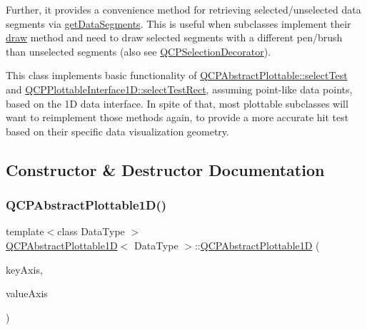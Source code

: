 Further, it provides a convenience method for retrieving selected/unselected data segments via \hyperlink{class_q_c_p_abstract_plottable1_d_ae890e62ce403c54f575c73b9529f1af8}{get\+Data\+Segments}. This is useful when subclasses implement their \hyperlink{class_q_c_p_abstract_plottable_a453f676a5cee7bf846c5f0fa05ea84b3}{draw} method and need to draw selected segments with a different pen/brush than unselected segments (also see \hyperlink{class_q_c_p_selection_decorator}{Q\+C\+P\+Selection\+Decorator}).

This class implements basic functionality of \hyperlink{class_q_c_p_abstract_plottable_a38efe9641d972992a3d44204bc80ec1d}{Q\+C\+P\+Abstract\+Plottable\+::select\+Test} and \hyperlink{class_q_c_p_plottable_interface1_d_a67093e4ccf490ff5f7750640941ff34c}{Q\+C\+P\+Plottable\+Interface1\+D\+::select\+Test\+Rect}, assuming point-\/like data points, based on the 1D data interface. In spite of that, most plottable subclasses will want to reimplement those methods again, to provide a more accurate hit test based on their specific data visualization geometry. 

\subsection{Constructor \& Destructor Documentation}
\mbox{\label{class_q_c_p_abstract_plottable1_d_a30b2e50ab0afce65f104ea7a95440315}} 
\subsubsection{\texorpdfstring{Q\+C\+P\+Abstract\+Plottable1\+D()}{QCPAbstractPlottable1D()}}
{\footnotesize\ttfamily template$<$class Data\+Type $>$ \\
\hyperlink{class_q_c_p_abstract_plottable1_d}{Q\+C\+P\+Abstract\+Plottable1D}$<$ Data\+Type $>$\+::\hyperlink{class_q_c_p_abstract_plottable1_d}{Q\+C\+P\+Abstract\+Plottable1D} (\begin{DoxyParamCaption}\item[{\hyperlink{class_q_c_p_axis}{Q\+C\+P\+Axis} $\ast$}]{key\+Axis,  }\item[{\hyperlink{class_q_c_p_axis}{Q\+C\+P\+Axis} $\ast$}]{value\+Axis }\end{DoxyParamCaption})}

